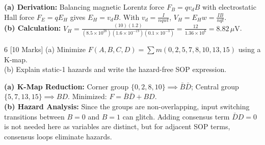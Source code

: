 \begin{solbox}
\textbf{(a) Derivation:} Balancing magnetic Lorentz force $F_B = q v_d B$ with electrostatic Hall force $F_E = q E_H$ gives $E_H = v_d B$. With $v_d = \frac{I}{n q w t}$, $V_H = E_H w = \frac{I B}{n q t}$.\\
\textbf{(b) Calculation:} $V_H = \frac{(10)(1.2)}{(8.5 \times 10^{28})(1.6 \times 10^{-19})(0.1 \times 10^{-3})} = \frac{12}{1.36 \times 10^6} = 8.82\,\mu\text{V}$.
\end{solbox}

\begin{examqbox}{6 [10 Marks]}
(a) Minimize $F(A,B,C,D) = \sum m(0, 2, 5, 7, 8, 10, 13, 15)$ using a K-map.\\
(b) Explain static-1 hazards and write the hazard-free SOP expression.
\end{examqbox}

\begin{solbox}
\textbf{(a) K-Map Reduction:} Corner group $\{0, 2, 8, 10\} \implies \bar{B}\bar{D}$; Central group $\{5, 7, 13, 15\} \implies BD$. Minimized: $F = \bar{B}\bar{D} + BD$.\\
\textbf{(b) Hazard Analysis:} Since the groups are non-overlapping, input switching transitions between $B=0$ and $B=1$ can glitch. Adding consensus term $\bar{D}D=0$ is not needed here as variables are distinct, but for adjacent SOP terms, consensus loops eliminate hazards.
\end{solbox}
